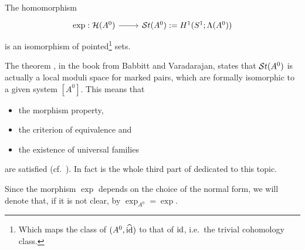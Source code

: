 \begin{center}
  \begin{minipage}[t]{0.8\textwidth}
    \begin{tthm}\label{thm:mainThm1}
      The homomorphism
      \[ \begin{tikzcd}
          \exp:\cH(A^0) \rar& \St(A^0):=H^1(S^1;\Lambda(A^0))
      \end{tikzcd} \]
      is an isomorphism of pointed\footnote{Which maps the class of
      $(A^0,\widehat{\operatorname{id}})$ to that of $\operatorname{id}$, i.e.\ the trivial cohomology class.} sets.
    \end{tthm}
  \end{minipage}
\end{center}
\begin{rem}
  The theorem \cite[Thm.III.1.1.2]{babbitt1989local}, in the book from
  Babbitt and Varadarajan, states that $\mathcal{S}{}t(A^0)$ is actually a local moduli
  space for marked pairs, which are formally isomorphic to a given system
  $[A^0]$.
  This means that
  \begin{itemize}
    \item the morphism property,
    \item the criterion of equivalence and
    \item the existence of universal families
  \end{itemize}
  are satisfied (cf.\ \cite[169]{babbitt1989local}).
  In fact is the whole third part of \cite{babbitt1989local} dedicated to this
  topic.
\end{rem}
Since the morphism $\exp$ depends on the choice of the normal form, we will
denote that, if it is not clear, by $\exp_{A^0}=\exp$.
